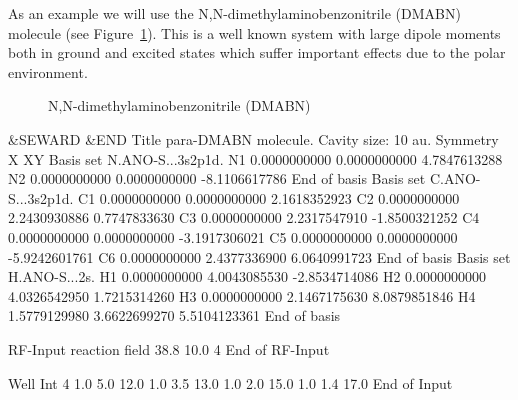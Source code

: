 
As an example we will use the N,N-dimethylaminobenzonitrile (DMABN) molecule
(see Figure~\ref{fig:dmabn}).
This is a well known system with large dipole moments both in ground and
excited states which suffer important effects due to the polar environment.

\begin{figure}[ht]
\caption{\label{fig:dmabn}N,N-dimethylaminobenzonitrile (DMABN)}
\end{figure}

\begin{inputlisting}
 &SEWARD &END                                                                   
Title                                                                           
para-DMABN molecule. Cavity size: 10 au.
Symmetry          
 X XY    
Basis set                                                                       
N.ANO-S...3s2p1d.
N1             0.0000000000        0.0000000000        4.7847613288
N2             0.0000000000        0.0000000000       -8.1106617786
End of basis                                                                    
Basis set                                                                       
C.ANO-S...3s2p1d.
C1             0.0000000000        0.0000000000        2.1618352923
C2             0.0000000000        2.2430930886        0.7747833630
C3             0.0000000000        2.2317547910       -1.8500321252
C4             0.0000000000        0.0000000000       -3.1917306021
C5             0.0000000000        0.0000000000       -5.9242601761
C6             0.0000000000        2.4377336900        6.0640991723
End of basis                                                                    
Basis set                                                                       
H.ANO-S...2s.
H1             0.0000000000        4.0043085530       -2.8534714086
H2             0.0000000000        4.0326542950        1.7215314260
H3             0.0000000000        2.1467175630        8.0879851846
H4             1.5779129980        3.6622699270        5.5104123361
End of basis                                                                    

RF-Input
reaction field
38.8 10.0 4
End of RF-Input

Well Int
4
1.0 5.0 12.0 
1.0 3.5 13.0
1.0 2.0 15.0
1.0 1.4 17.0
End of Input                                                                    


\end{inputlisting}
